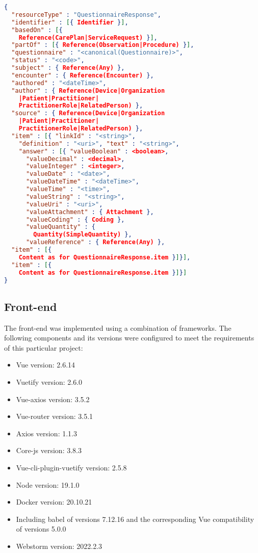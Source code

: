 \documentclass[
a4paper,
11pt
]{article}
\begin{document}
	\begin{lstlisting}[language=json,firstnumber=1,caption={QuestionnaireResponse.json},captionpos=b]
{
  "resourceType" : "QuestionnaireResponse",
  "identifier" : [{ Identifier }],
  "basedOn" : [{
  	Reference(CarePlan|ServiceRequest) }],
  "partOf" : [{ Reference(Observation|Procedure) }],
  "questionnaire" : "<canonical(Questionnaire)>",
  "status" : "<code>",
  "subject" : { Reference(Any) },
  "encounter" : { Reference(Encounter) }, 
  "authored" : "<dateTime>",
  "author" : { Reference(Device|Organization
  	|Patient|Practitioner|
    PractitionerRole|RelatedPerson) },
  "source" : { Reference(Device|Organization
  	|Patient|Practitioner|
    PractitionerRole|RelatedPerson) },
  "item" : [{ "linkId" : "<string>",
    "definition" : "<uri>", "text" : "<string>",
    "answer" : [{ "valueBoolean" : <boolean>,
      "valueDecimal" : <decimal>,
      "valueInteger" : <integer>,
      "valueDate" : "<date>",
      "valueDateTime" : "<dateTime>",
      "valueTime" : "<time>",
      "valueString" : "<string>",
      "valueUri" : "<uri>",
      "valueAttachment" : { Attachment },
      "valueCoding" : { Coding },
      "valueQuantity" : {
      	Quantity(SimpleQuantity) },
      "valueReference" : { Reference(Any) },
  "item" : [{
    Content as for QuestionnaireResponse.item }]}],
  "item" : [{
    Content as for QuestionnaireResponse.item }]}]
}
\end{lstlisting}
	
	\subsection{Front-end}
	
	The front-end was implemented using a combination of frameworks. The following components and its versions were configured to meet the requirements of this particular project:
	
	\begin{itemize}
		\item \ac{Vue} version: 2.6.14
		\item Vuetify version: 2.6.0
		\item Vue-axios version: 3.5.2
		\item Vue-router version: 3.5.1
		\item Axios version: 1.1.3
		\item Core-js version: 3.8.3
		\item Vue-cli-plugin-vuetify version: 2.5.8
		\item \ac{Node} version: 19.1.0
		\item Docker version: 20.10.21
		\item Including babel of versions 7.12.16 and the corresponding Vue compatibility of versions 5.0.0
		\item Webstorm version: 2022.2.3
	\end{itemize}
	
\end{document}
